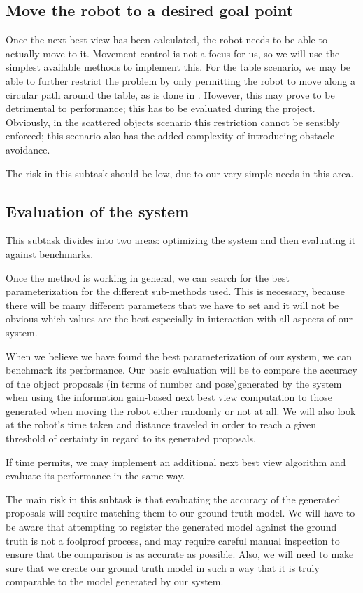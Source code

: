 \documentclass[a4paper,11pt,english]{article}
\begin{document}
\subsection{Move the robot to a desired goal point}\label{subtask-movement}
Once the next best view has been calculated, the robot needs to be able to actually move to it.
Movement control is not a focus for us, so we will use the simplest available methods to implement this.
For the table scenario, we may be able to further restrict the problem by only permitting the robot to move along a circular path around the table, as  is done in \cite{atanasov2014nonmyopic}.
However, this may prove to be detrimental to performance; this has to be evaluated during the project.
Obviously, in the scattered objects scenario this restriction cannot be sensibly enforced; this scenario also has the added complexity of introducing obstacle avoidance.

The risk in this subtask should be low, due to our very simple needs in this area.


\subsection{Evaluation of the system}\label{subtask-evaluation}
This subtask divides into two areas: optimizing the system and then evaluating it against benchmarks.

Once the method is working in general, we can search for the best parameterization for the different sub-methods used.
This is necessary, because there will be many different parameters that we have to set and it will not be obvious which values are the best especially in interaction with all aspects of our system.

When we believe we have found the best parameterization of our system, we can benchmark its performance.
Our basic evaluation will be to compare the accuracy of the object proposals  (in terms of number and pose)generated by the system when using the information gain-based next best view computation to those generated when moving the robot either randomly or not at all.
We will also look at the robot's time taken and distance traveled in order to reach a given threshold of certainty in regard to its generated proposals.

If time permits, we may implement an additional next best view algorithm and evaluate its performance in the same way.

The main risk in this subtask is that evaluating the accuracy of the generated proposals will require matching them to our ground truth model.
We will have to be aware that attempting to register the generated model against the ground truth is not a foolproof process, and may require careful manual inspection to ensure that the comparison is as accurate as possible.
Also, we will need to make sure that we create our ground truth model in such a way that it is truly comparable to the model generated by our system.
\end{document}
